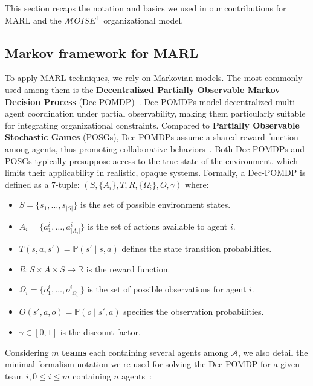\documentclass[pdflatex,sn-mathphys-num]{sn-jnl}%
\theoremstyle{thmstyleone}%
\theoremstyle{thmstyletwo}%
\theoremstyle{thmstylethree}%
\begin{document}
This section recaps the notation and basics we used in our contributions for MARL and the $\mathcal{M}OISE^+$ organizational model.

\subsection{Markov framework for MARL}

To apply MARL techniques, we rely on Markovian models. The most commonly used among them is the \textbf{Decentralized Partially Observable Markov Decision Process} (Dec-POMDP)~\cite{Oliehoek2016}. Dec-POMDPs model decentralized multi-agent coordination under partial observability, making them particularly suitable for integrating organizational constraints. Compared to \textbf{Partially Observable Stochastic Games} (POSGs), Dec-POMDPs assume a shared reward function among agents, thus promoting collaborative behaviors~\cite{Matignon2007}. Both Dec-POMDPs and POSGs typically presuppose access to the true state of the environment, which limits their applicability in realistic, opaque systems.
%
Formally, a Dec-POMDP is defined as a 7-tuple:
%
$\left(S, \{A_i\}, T, R, \{\Omega_i\}, O, \gamma \right)$
%
where:
\begin{itemize}
    \item $S = \{s_1, \dots, s_{|S|}\}$ is the set of possible environment states.
    \item $A_i = \{a_1^i, \dots, a_{|A_i|}^i\}$ is the set of actions available to agent $i$.
    \item $T(s, a, s') = \mathbb{P}(s' \mid s, a)$ defines the state transition probabilities.
    \item $R: S \times A \times S \rightarrow \mathbb{R}$ is the reward function.
    \item $\Omega_i = \{o_1^i, \dots, o_{|\Omega_i|}^i\}$ is the set of possible observations for agent $i$.
    \item $O(s', a, o) = \mathbb{P}(o \mid s', a)$ specifies the observation probabilities.
    \item $\gamma \in [0, 1]$ is the discount factor.
\end{itemize}

\noindent Considering $m$ \textbf{teams} each containing several agents among $\mathcal{A}$, we also detail the minimal formalism notation we re-used for solving the Dec-POMDP for a given team $i, 0 \leq i \leq m$ containing $n$ agents~\cite{Matignon2007,Yuan2023}:
\end{document}
